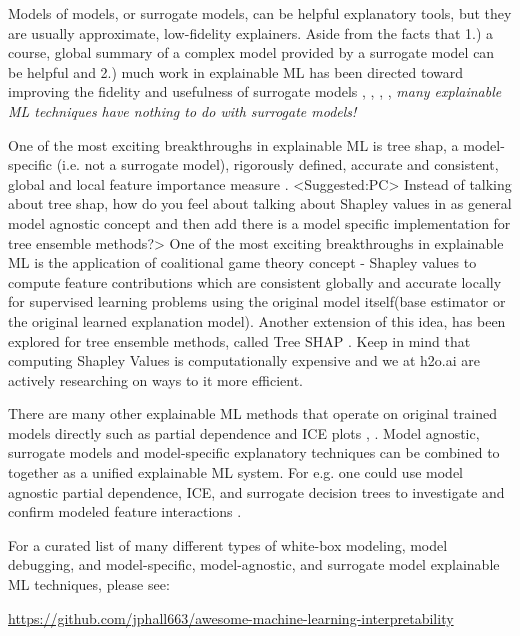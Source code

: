 \documentclass{article}
\begin{document}
Models of models, or surrogate models, can be helpful explanatory tools, but they are usually approximate, low-fidelity explainers. Aside from the facts that 1.) a course, global summary of a complex model provided by a surrogate model can be helpful and 2.) much work in explainable ML has been directed toward improving the fidelity and usefulness of surrogate models \citep{dt_surrogate1}, \cite{dt_surrogate2}, \cite{lime-sup}, \cite{wf_xnn}, \textit{many explainable ML techniques have nothing to do with surrogate models!}

One of the most exciting breakthroughs in explainable ML is tree shap, a model-specific (i.e. not a surrogate model), rigorously defined, accurate and consistent, global and local feature importance measure \cite{tree_shap}. 
<Suggested:PC> Instead of talking about tree shap, how do you feel about talking about Shapley values in as general model agnostic concept \cite{kononenko2010efficient} and then add there is a model specific implementation for tree ensemble methods?>
One of the most exciting breakthroughs in explainable ML is the application of coalitional game theory concept - Shapley values \cite{kononenko2010efficient} \cite{shapley} to compute feature contributions which are consistent globally and accurate locally for supervised learning problems using the original model itself(base estimator or the original learned explanation model). Another extension of this idea, has been explored for tree ensemble methods, called Tree SHAP \cite{tree_shap}. Keep in mind that computing Shapley Values is computationally expensive and we at h2o.ai are actively researching on ways to it more efficient.

There are many other explainable ML methods that operate on original trained models directly such as partial dependence and ICE plots \cite{esl}, \cite{ice_plots}. Model agnostic, surrogate models and model-specific explanatory techniques can be combined to together as a unified explainable ML system. For e.g. one could use model agnostic partial dependence, ICE, and surrogate decision trees to investigate and confirm modeled feature interactions \cite{art_and_sci}. 

For a curated list of many different types of white-box modeling, model debugging, and model-specific, model-agnostic, and surrogate model explainable ML techniques, please see:
\begin{center}
\url{https://github.com/jphall663/awesome-machine-learning-interpretability}
\end{center}
\end{document}
